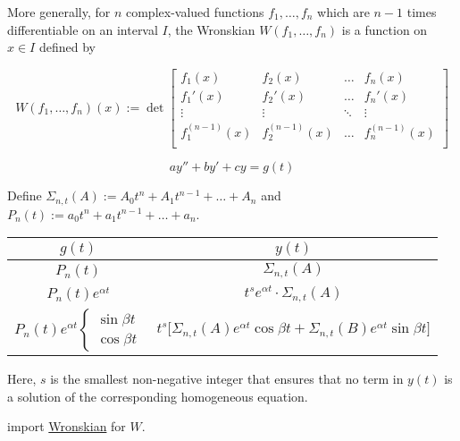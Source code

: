 More generally, for $n$ complex-valued functions $f_1,\ldots,f_n$ which are
$n-1$ times differentiable on an interval $I$, the Wronskian
$W(f_1,\ldots,f_n)$ is a function on $x\in I$ defined by

$$
  W(f_1,\ldots,f_n)(x):=\det\begin{bmatrix}
    f_1(x)         & f_2(x)         & \ldots & f_n(x)         \\
    f_1'(x)        & f_2'(x)        & \ldots & f_n'(x)        \\
    \vdots         & \vdots         & \ddots & \vdots         \\
    f_1^{(n-1)}(x) & f_2^{(n-1)}(x) & \ldots & f_n^{(n-1)}(x) \\
  \end{bmatrix}
$$

\label{af8932c}

$$ay''+by'+cy=g(t)$$

Define $\Sigma_{n,t}(A):=A_0t^n+A_1t^{n-1}+\ldots+A_n$ and
$P_n(t):=a_0t^n+a_1t^{n-1}+\ldots+a_n$.

\begin{center}
  \def\squirl{\begin{cases}\sin\beta t\\\cos\beta t\end{cases}}
  \def\S#1{\Sigma_{n,t}({#1})}
  \begin{tabular}{|c|c|}
    \hline
    $g(t)$                      & $y(t)$                                                                 \\
    \hline
    $P_n(t)$                    & $\S A$                                                                 \\
    \hline
    $P_n(t)e^{\alpha t}$        & $t^se^{\alpha t}\cdot\S A$                                             \\
    \hline
    $P_n(t)e^{\alpha t}\squirl$ & $t^s\big[\S Ae^{\alpha t}\cos\beta t+\S Be^{\alpha t}\sin\beta t\big]$ \\
    \hline
  \end{tabular}
\end{center}

Here, $s$ is the smallest non-negative integer that ensures that no term in
$y(t)$ is a solution of the corresponding homogeneous equation.

\label{cc51fcb}

import \href{b70073b}{Wronskian} for $W$.

